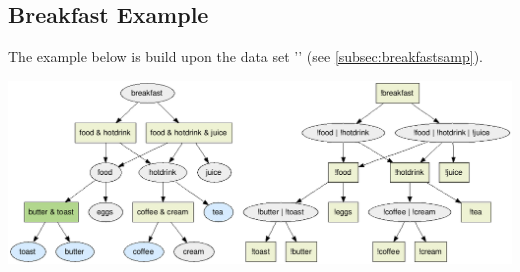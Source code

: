 \documentclass[11pt]{article}
\begin{document}
\begin{appendices}
\subsection{Breakfast Example}
The example below is build upon the data set '' (see \ref{subsec:breakfastsamp}).\\
\begin{center}
	\includegraphics[scale=0.35]{GFX/breakfast_example.png}
\end{center}
\end{appendices}
\end{document}
